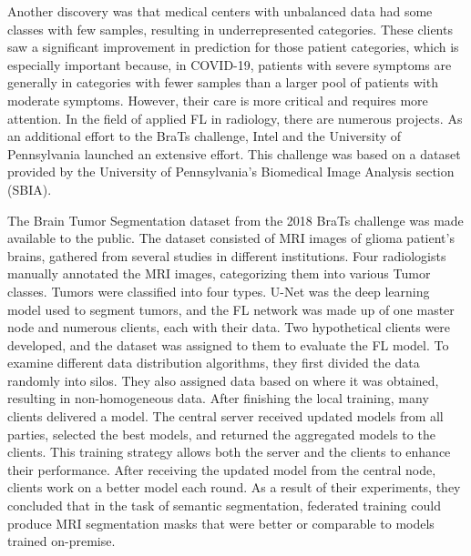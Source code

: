 Another discovery was that medical centers with unbalanced data had some classes with few samples, resulting in underrepresented categories. These clients saw a significant improvement in prediction for those patient categories, which is especially important because, in COVID-19, patients with severe symptoms are generally in categories with fewer samples than a larger pool of patients with moderate symptoms. However, their care is more critical and requires more attention.  In the field of applied FL in radiology, there are numerous projects. As an additional effort to the BraTs challenge, Intel and the University of Pennsylvania launched an extensive effort. This challenge was based on a dataset provided by the University of Pennsylvania's Biomedical Image Analysis section (SBIA)\cite{bakas2017advancing}.  

The Brain Tumor Segmentation dataset from the 2018 BraTs challenge was made available to the public. The dataset consisted of MRI images of glioma patient's brains,  gathered from several studies in different institutions. Four radiologists manually annotated the MRI images, categorizing them into various Tumor classes. Tumors were classified into four types. U-Net was the deep learning model used to segment tumors, and the FL network was made up of one master node and numerous clients, each with their data. Two hypothetical clients were developed, and the dataset was assigned to them to evaluate the FL model. To examine different data distribution algorithms, they first divided the data randomly into silos. They also assigned data based on where it was obtained, resulting in non-homogeneous data. After finishing the local training, many clients delivered a model. The central server received updated models from all parties, selected the best models, and returned the aggregated models to the clients. This training strategy allows both the server and the clients to enhance their performance. After receiving the updated model from the central node, clients work on a better model each round. As a result of their experiments, they concluded that in the task of semantic segmentation, federated training could produce MRI segmentation masks that were better or comparable to models trained on-premise. 


